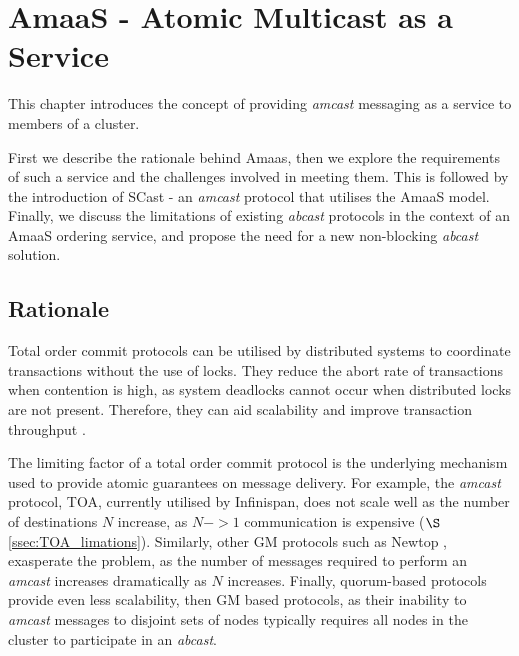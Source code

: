 \chapter{AmaaS - Atomic Multicast as a Service}\label{ch:amaas}

    \graphicspath{{Chapter3-TxService/Figs/Vector/}{Chapter3-TxService/Figs/}}

This chapter introduces the concept of providing \emph{amcast} messaging as a service to members of a cluster.

First we describe the rationale behind \textsf{Amaas}, then we explore the requirements of such a service and the challenges involved in meeting them.  This is followed by the introduction of \textsf{SCast} - an \emph{amcast} protocol that utilises the \textsf{AmaaS} model.  Finally, we discuss the limitations of existing \emph{abcast} protocols in the context of an \textsf{AmaaS} ordering service, and propose the need for a new non-blocking \emph{abcast} solution.  

\section{Rationale}
Total order commit protocols can be utilised by distributed systems to coordinate transactions without the use of locks.  They reduce the abort rate of transactions when contention is high, as system deadlocks cannot occur when distributed locks are not present.  Therefore, they can aid scalability and improve transaction throughput \citep{Ruivo:2011:ETO:2120967.2121604}.  

The limiting factor of a total order commit protocol is the underlying mechanism used to provide atomic guarantees on message delivery.  For example, the \emph{amcast} protocol, TOA, currently utilised by Infinispan, does not scale well as the number of destinations $N$ increase, as $N->1$ communication is expensive ($\S$ \ref{ssec:TOA_limations}).  Similarly, other GM protocols such as Newtop \citep{Ezhilchelvan:1995:NFG:876885.880005}, exasperate the problem, as the number of messages required to perform an \emph{amcast} increases dramatically as $N$ increases.  Finally, quorum-based protocols provide even less scalability, then GM based protocols, as their inability to \emph{amcast} messages to disjoint sets of nodes typically requires all nodes in the cluster to participate in an \emph{abcast}.  

